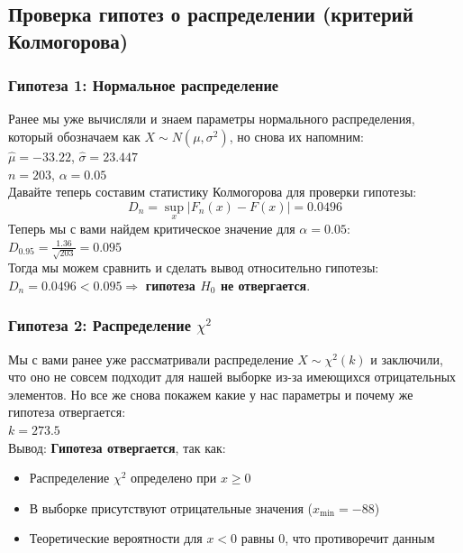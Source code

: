 \documentclass[12pt]{article}
\begin{document}
\subsection{Проверка гипотез о распределении (критерий Колмогорова)}

\subsubsection*{Гипотеза 1: Нормальное распределение}
Ранее мы уже вычисляли и знаем параметры нормального распределения, который обозначаем как $X \sim N(\mu, \sigma^2)$, но снова их напомним:\\
$\hat{\mu} = -33.22$, $\hat{\sigma} = 23.447$ \\
$n = 203$, $\alpha = 0.05$ \\
Давайте теперь составим статистику Колмогорова для проверки гипотезы:
\[
D_n = \sup_x |F_n(x) - F(x)| = 0.0496
\]
Теперь мы с вами найдем критическое значение для $\alpha=0.05$:
$D_{0.95} = \frac{1.36}{\sqrt{203}} = 0.095$ \\
Тогда мы можем сравнить и сделать вывод относительно гипотезы: $D_n = 0.0496 < 0.095 \Rightarrow$ \textbf{гипотеза $H_0$ не отвергается}.

\subsubsection*{Гипотеза 2: Распределение $\chi^2$}
Мы с вами ранее уже рассматривали распределение $X \sim \chi^2(k)$ и заключили, что оно не совсем подходит для нашей выборке из-за имеющихся отрицательных элементов.
Но все же снова покажем какие у нас параметры и почему же гипотеза отвергается:\\
$k = 273.5$ \\
Вывод: \textbf{Гипотеза отвергается}, так как:
\begin{itemize}
    \item Распределение $\chi^2$ определено при $x \geq 0$
    \item В выборке присутствуют отрицательные значения ($x_{\min} = -88$)
    \item Теоретические вероятности для $x < 0$ равны 0, что противоречит данным
\end{itemize}
\end{document}
